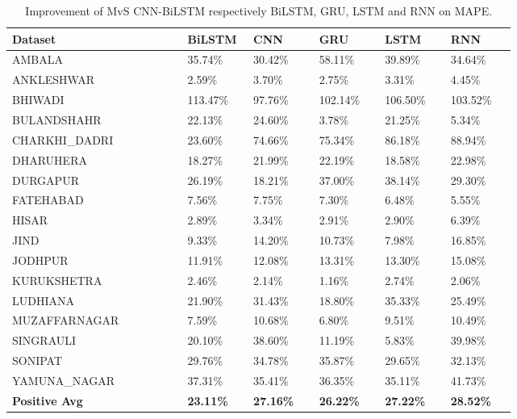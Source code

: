 \begin{table}[H]
  \setlength{\tabcolsep}{3pt}
  {\renewcommand{\arraystretch}{1}%
  \begin{longtable}[c]{ p{0.32\linewidth} p{0.12\linewidth} p{0.12\linewidth} p{0.12\linewidth}  p{0.12\linewidth} p{0.12\linewidth}}%
    \caption{ Improvement of MvS CNN-BiLSTM respectively BiLSTM,  GRU,  LSTM and RNN on MAPE.}
    \label{MAPE imp}
  \\ \hline
  Dataset       &   BiLSTM &CNN & GRU &   LSTM &   RNN 
  \\ \hline
  \endhead
  AMBALA & 35.74\% & 30.42\% & 58.11\% & 39.89\% & 34.64\% \\
  ANKLESHWAR & 2.59\% & 3.70\% & 2.75\% & 3.31\% & 4.45\% \\
  BHIWADI & 113.47\% & 97.76\% & 102.14\% & 106.50\% & 103.52\% \\
  BULANDSHAHR & 22.13\% & 24.60\% & 3.78\% & 21.25\% & 5.34\% \\
  CHARKHI\_DADRI & 23.60\% & 74.66\% & 75.34\% & 86.18\% & 88.94\% \\
  DHARUHERA & 18.27\% & 21.99\% & 22.19\% & 18.58\% & 22.98\% \\
  DURGAPUR & 26.19\% & 18.21\% & 37.00\% & 38.14\% & 29.30\% \\
  FATEHABAD & 7.56\% & 7.75\% & 7.30\% & 6.48\% & 5.55\% \\
  HISAR & 2.89\% & 3.34\% & 2.91\% & 2.90\% & 6.39\% \\
  JIND & 9.33\% & 14.20\% & 10.73\% & 7.98\% & 16.85\% \\
  JODHPUR & 11.91\% & 12.08\% & 13.31\% & 13.30\% & 15.08\% \\
  KURUKSHETRA & 2.46\% & 2.14\% & 1.16\% & 2.74\% & 2.06\% \\
  LUDHIANA & 21.90\% & 31.43\% & 18.80\% & 35.33\% & 25.49\% \\
  MUZAFFARNAGAR & 7.59\% & 10.68\% & 6.80\% & 9.51\% & 10.49\% \\
  SINGRAULI & 20.10\% & 38.60\% & 11.19\% & 5.83\% & 39.98\% \\
  SONIPAT & 29.76\% & 34.78\% & 35.87\% & 29.65\% & 32.13\% \\
  YAMUNA\_NAGAR & 37.31\% & 35.41\% & 36.35\% & 35.11\% & 41.73\% \\ \hline
  \textbf{Positive Avg} & \textbf{23.11\% }& \textbf{27.16\% }& \textbf{26.22\%} & \textbf{27.22\%} & \textbf{28.52\%} \\ \hline
  \end{longtable}}
  \end{table}

